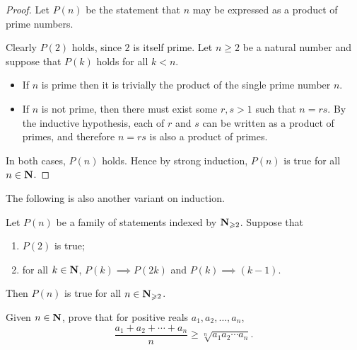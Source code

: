 \begin{proof}
Let $P(n)$ be the statement that $n$ may be expressed as a product of prime numbers. 

Clearly $P(2)$ holds, since $2$ is itself prime. Let $n\ge 2$ be a natural number and suppose that $P(k)$ holds for all $k<n$.

\begin{itemize}
\item If $n$ is prime then it is trivially the product of the single prime number $n$. 

\item If $n$ is not prime, then there must exist some $r, s > 1$ such that $n = rs$. By the inductive hypothesis, each of $r$ and $s$ can be written as a product of primes, and therefore $n = rs$ is also a product of primes.
\end{itemize}

In both cases, $P(n)$ holds. Hence by strong induction, $P(n)$ is true for all $n\in\mathbf N$.
\end{proof}

The following is also another variant on induction.

\begin{theorem}
Let $P(n)$ be a family of statements indexed by $\mathbf N_{\geqslant2}$. Suppose that
\begin{enumerate}[label=(\roman*)]
\item $P(2)$ is true;
\item for all $k\in\mathbf N$, $P(k)\implies P(2k)$ and $P(k)\implies (k-1)$.
\end{enumerate}
Then $P(n)$ is true for all $n\in\mathbf N_{\geqslant2}$.
\end{theorem}

\begin{exercise}[AM--GM inequality]
Given $n\in\mathbf N$, prove that for positive reals $a_1,a_2,\dots,a_n$,
\[\frac{a_1+a_2+\cdots+a_n}{n}\ge\sqrt[n]{a_1a_2\cdots a_n}.\]
\end{exercise}

